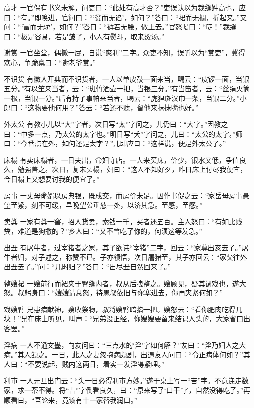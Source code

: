 \documentclass[12pt,UTF8]{ctexbook}
\begin{document}
高才
一官偶有书义未解，问吏曰：“此处有高才否？”吏误认以为裁缝姓高也，应曰：“有。”即唤进，官问曰：“‘贫而无谄’，如何？”答曰：“裙而无襉，折起来。”又问：“‘富而无骄’，如何？”答曰：“裤若无腰，做上去。”官怒喝曰：“唗！”裁缝曰：“极是容易，若是皱了，小人有熨斗，取来烫汤。”

谢赏
一官坐堂，偶撒一屁，自说“爽利”二字。众吏不知，误听以为“赏吏”，冀得欢心，争跪禀曰：“谢老爷赏。”

不识货
有徽人开典而不识货者，一人以单皮鼓一面来当，喝云：“皮锣一面，当银五分。”有以笙来当者，云：“斑竹酒壶一把，当银三分。”有当笛者，云：“丝绢火筒一根，当银一分。”后有持了事帕来当者，喝云：“虎狸斑汉巾一条，当银二分。”小郎曰：“这物要他何用？”答云：“若还不赎，留他来抹抹嘴也好。”

外太公
有教小儿以“大”字者，次日写“太”字问之，儿仍曰：“大字。”因教之曰：“中多一点，乃太公的太字也。”明日写“犬”字问之，儿曰：“太公的太字。”师曰：“今番点在外，如何还是太字？”儿即应曰：“这样说，便是外太公了。”

床榻
有卖床榻者，一日夫出，命妇守店。一人来买床，价少，银水又低，争值良久，勉强售之。次日，复宋买榻，妇曰：“这人不知好歹，昨日床上讨尽我便宜，今日榻上又想要讨我的便宜了。”

房事
一丈母命婿以房典银，既成交，而房价未足。因作书促之云：“家岳母房事悬望至紧，刻不可缓，早晚望公垂慈一处，以济其急。至感，至感。”

卖粪
一家有粪一窖，招人货卖，索钱一千，买者还五百。主人怒曰：“有如此贱粪，难道是狗撒的？”乡人曰：“又不曾吃了你的，何须这等发急。”

出丑
有屠牛者，过宰猪者之家，其子欲讳“宰猪”二字，回云：“家尊出亥去了。”屠牛者归，对子述之，称赞不已。子亦领悟，次日屠猪至，其子亦回云：“家父往外出丑去了。”问：“几时归？”答曰：“出尽丑自然回来了。”

整嫂裙
一嫂前行而裙夹于臀缝内者，叔从后拽整之。嫂顾见，疑其调戏也，遂大怒。叔躬身曰：“嫂嫂请息怒，待愚叔依旧与你塞进去，你再夹紧何如？”

戏嫂臂
兄患病献神，嫂收祭物，叔将嫂臂暗掐一把。嫂怒云：“看你肥肉吃得几块！”兄在床上听见，叫声：“兄弟没正经，你嫂嫂要留来结识人头的，大家省口出客罢。”

淫病
一人不通文墨，向友问曰：“三点水的‘淫’字如何解？”友曰：“淫乃妇人之大病。”其人颔之。一日，此人之妻忽抱病颇剧，出遇友人问曰：“令正病体何如？”其人曰：“不要说起，贱内这两日，着实一发淫得紧哩。”

利市
一人元旦出门云：“头一日必得利市方妙。”遂于桌上写一“吉”字。不意连走数家，求一茶不得。将“吉”字倒看良久，曰：“原来写了‘口干’字，自然没得吃了。”再顺看曰，“吾论来，竟该有十一家替我润口。”
\end{document}
